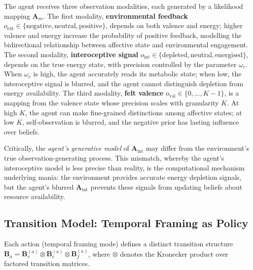 \documentclass[11pt,a4paper]{article}
\begin{document}
The agent receives three observation modalities, each generated by a likelihood mapping $\mathbf{A}_m$. The first modality, \textbf{environmental feedback} $o_{\text{ext}} \in \{\text{negative}, \text{neutral}, \text{positive}\}$, depends on both valence and energy; higher valence and energy increase the probability of positive feedback, modelling the bidirectional relationship between affective state and environmental engagement. The second modality, \textbf{interoceptive signal} $o_{\text{int}} \in \{\text{depleted}, \text{neutral}, \text{energised}\}$, depends on the true energy state, with precision controlled by the parameter $\omega_e$. When $\omega_e$ is high, the agent accurately reads its metabolic state; when low, the interoceptive signal is blurred, and the agent cannot distinguish depletion from energy availability. The third modality, \textbf{felt valence} $o_{\text{val}} \in \{0, \ldots, K{-}1\}$, is a mapping from the valence state whose precision scales with granularity $K$. At high $K$, the agent can make fine-grained distinctions among affective states; at low $K$, self-observation is blurred, and the negative prior has lasting influence over beliefs.

Critically, the \emph{agent's generative model} of $\mathbf{A}_{\text{int}}$ may differ from the environment's true observation-generating process. This mismatch, whereby the agent's interoceptive model is less precise than reality, is the computational mechanism underlying mania: the environment provides accurate energy depletion signals, but the agent's blurred $\mathbf{A}_{\text{int}}$ prevents these signals from updating beliefs about resource availability.

\subsection{Transition Model: Temporal Framing as Policy}

Each action (temporal framing mode) defines a distinct transition structure $\mathbf{B}_a = \mathbf{B}_v^{(a)} \otimes \mathbf{B}_e^{(a)} \otimes \mathbf{B}_f^{(a)}$, where $\otimes$ denotes the Kronecker product over factored transition matrices.
\end{document}
